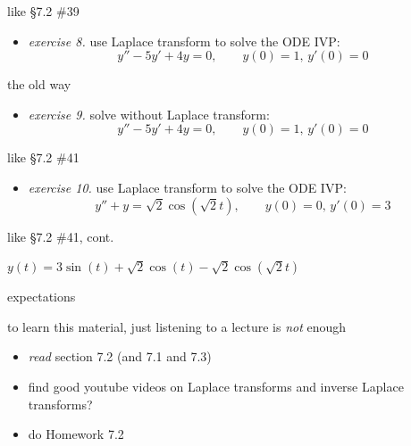 \documentclass[dvipsnames,colorlinks]{beamer}
\begin{document}
\begin{frame}{like \S7.2 \#39}

\begin{itemize}
\item \emph{exercise 8.}  use Laplace transform to solve the ODE IVP:
    $$y''-5y'+4y=0, \qquad y(0)=1, \, y'(0)=0$$

\vspace{55mm}
\end{itemize}
\end{frame}


\begin{frame}{the old way}

\begin{itemize}
\item \emph{exercise 9.}  solve without Laplace transform:
    $$y''-5y'+4y=0, \qquad y(0)=1, \, y'(0)=0$$

\vspace{55mm}
\end{itemize}
\end{frame}


\begin{frame}{like \S7.2 \#41}

\begin{itemize}
\item \emph{exercise 10.}  use Laplace transform to solve the ODE IVP:
    $$y''+y=\sqrt{2} \cos(\sqrt{2} t), \qquad y(0)=0, \, y'(0)=3$$

\vspace{50mm}
\end{itemize}
\end{frame}


\begin{frame}{like \S7.2 \#41, cont.}


\vspace{60mm}
\hfill $y(t) = 3 \sin(t) + \sqrt{2} \cos(t) - \sqrt{2}\cos(\sqrt{2} t)$
\end{frame}


\begin{frame}{expectations}

to learn this material, just listening to a lecture is \emph{not} enough
     \begin{itemize}
     \item \emph{read} section 7.2 (and 7.1 and 7.3)
     \item find good youtube videos on Laplace transforms and inverse Laplace transforms?
     \item do Homework 7.2
     \end{itemize}
\end{frame}
\end{document}
